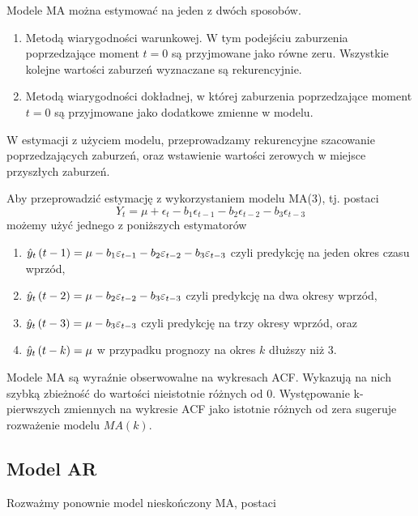 \documentclass[10pt,a4paper]{book}
\begin{document}
Modele MA można estymować na jeden z dwóch sposobów.
\begin{enumerate}
\item Metodą wiarygodności warunkowej. W tym podejściu zaburzenia poprzedzające moment $t=0$ są przyjmowane jako równe zeru. Wszystkie kolejne wartości zaburzeń wyznaczane są rekurencyjnie.
\item Metodą wiarygodności dokładnej, w której zaburzenia poprzedzające moment $t=0$ są przyjmowane jako dodatkowe zmienne w modelu.
\end{enumerate}

W estymacji z użyciem modelu, przeprowadzamy rekurencyjne szacowanie poprzedzających zaburzeń, oraz wstawienie wartości zerowych w miejsce przyszłych zaburzeń.

\begin{example}
Aby przeprowadzić estymację z wykorzystaniem modelu MA(3), tj. postaci
$$
Y_t = \mu + \epsilon_t - b_1 \epsilon_{t-1} - b_2 \epsilon_{t-2} - b_3 \epsilon_{t-3}
$$
możemy użyć jednego z poniższych estymatorów
\begin{enumerate}
\item $\predict[t-1]{y}{t} = \mu  - b_1 \epsilon_{t-1} - b_2 \epsilon_{t-2} - b_3 \epsilon_{t-3}$ czyli predykcję na jeden okres czasu wprzód,
\item $\predict[t-2]{y}{t} = \mu - b_2 \epsilon_{t-2} - b_3 \epsilon_{t-3}$ czyli predykcję na dwa okresy wprzód,
\item $\predict[t-3]{y}{t} = \mu - b_3 \epsilon_{t-3}$ czyli predykcję na trzy okresy wprzód, oraz
\item $\predict[t-k]{y}{t} = \mu$ w przypadku prognozy na okres $k$ dłuższy niż 3.
\end{enumerate}
\end{example}

\begin{remark}
Modele MA są wyraźnie obserwowalne na wykresach ACF. Wykazują na nich szybką zbieżność do wartości nieistotnie różnych od 0. Występowanie k-pierwszych zmiennych na wykresie ACF jako istotnie różnych od zera sugeruje rozważenie modelu $MA(k)$.
\end{remark}


\subsection{Model AR}

Rozważmy ponownie model nieskończony MA, postaci
\end{document}
